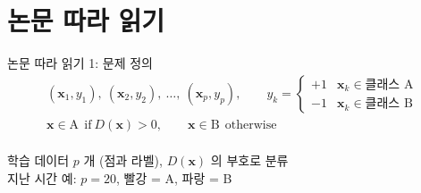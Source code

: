 \documentclass[aspectratio=169,11pt,t]{beamer}
\begin{document}
\section{논문 따라 읽기}
\begin{frame}{논문 따라 읽기 1: 문제 정의}
\vfill
\centering
{\large\begin{gather*}
(\mathbf{x}_1, y_1),\ (\mathbf{x}_2, y_2),\ \dots,\ (\mathbf{x}_p, y_p), \qquad y_k = \begin{cases} +1 & \mathbf{x}_k \in \text{클래스 A}\\ -1 & \mathbf{x}_k \in \text{클래스 B} \end{cases}\\[0.6em]
\mathbf{x} \in \text{A} \ \ \text{if}\ D(\mathbf{x}) > 0, \qquad \mathbf{x} \in \text{B} \ \ \text{otherwise}
\end{gather*}}\\[0.6em]
{\large 학습 데이터 $p$ 개 (점과 라벨), \;$D(\mathbf{x})$ 의 부호로 분류}\\[0.3em]
{\normalsize 지난 시간 예: $p = 20$, 빨강 = A, 파랑 = B}
\vfill
{}
\end{frame}
\end{document}
